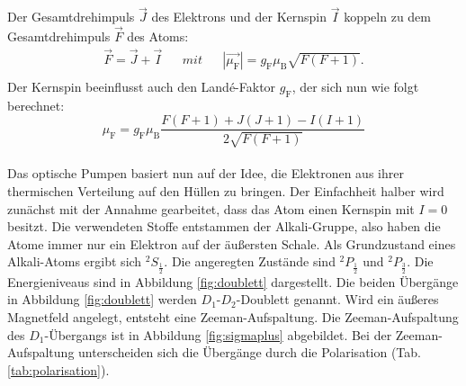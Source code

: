 Der Gesamtdrehimpuls $\vec{J}$ des Elektrons und der Kernspin $\vec{I}$ koppeln zu dem Gesamtdrehimpuls $\vec{F}$ des Atoms:
\begin{align*}
  \vec{F}=\vec{J}+\vec{I} && mit && |\vec{\mu_{\text{F}}}|= g_{\text{F}} \mu_{\text{B}} \sqrt{F(F+1)}.\\
\end{align*}
Der Kernspin beeinflusst auch den Landé-Faktor $g_{\text{F}}$, der sich nun wie folgt berechnet:
\begin{equation}
  \mu_{\text{F}}= g_{\text{F}} \mu_{\text{B}} \frac{F(F+1) + J(J+1) - I(I+1)}{2 \sqrt{F(F+1)}}
  \label{eqn:landef}
\end{equation}
%
%
\\Das optische Pumpen basiert nun auf der Idee, die Elektronen aus ihrer thermischen Verteilung auf den Hüllen zu bringen.
Der Einfachheit halber wird zunächst mit der Annahme gearbeitet, dass das Atom einen Kernspin mit $I=0$ besitzt.
Die verwendeten Stoffe entstammen der Alkali-Gruppe, also haben die Atome immer nur ein Elektron auf der äußersten Schale.
Als Grundzustand eines Alkali-Atoms ergibt sich $^{2}S_{\frac{1}{2}}$.
Die angeregten Zustände sind $^{2}P_{\frac{1}{2}}$ und $^{2}P_{\frac{3}{2}}$.
Die Energieniveaus sind in Abbildung \ref{fig:doublett} dargestellt.
Die beiden Übergänge in Abbildung \ref{fig:doublett} werden $D_{1}$-$D_{2}$-Doublett genannt.
Wird ein äußeres Magnetfeld angelegt, entsteht eine Zeeman-Aufspaltung.
Die Zeeman-Aufspaltung des $D_{1}$-Übergangs ist in Abbildung \ref{fig:sigmaplus} abgebildet.
Bei der Zeeman-Aufspaltung unterscheiden sich die Übergänge durch die Polarisation (Tab. \ref{tab:polarisation}).
